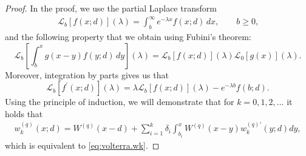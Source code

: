 \documentclass[12pt,reqno]{amsart}
\newcommand{\blue}{\textcolor[rgb]{0.00,0.00,1.00}}
\newcommand{\green}{\textcolor[rgb]{0.00,0.70,.30}}
\theoremstyle{definition}
\theoremstyle{remark}
\begin{document}
\begin{proof}
In the proof, we use the partial Laplace transform
\begin{align*}
\mathcal{L}_{b}[f(x;d)](\lambda)=\int_b^\infty e^{-\lambda x}f(x;d)\,dx,\qquad\text{$b\geq0$,}
\end{align*}
and the following property that we obtain using Fubini's theorem:
$$\mathcal{L}_{b}\left[\int_b^xg(x-y)f(y;d)\,dy\right](\lambda)=
\mathcal{L}_{b}[f(x;d)](\lambda) \mathcal{L}_0 [g(x)](\lambda).$$
Moreover, integration by parts gives us that
$$\mathcal{L}_{b}[f^{\prime}(x;d)](\lambda)=\lambda \mathcal{L}_{b}[f(x;d)](\lambda)- e^{-\lambda b} f(b;d).$$
  Using the principle of induction, we will demonstrate that for $k=0,1,2,\ldots$ it holds that
  \begin{align}
w_k^{(q)}(x;d)=W^{(q)}(x-d)+\sum_{i=1}^k\delta_i \int_{b_i}^xW^{(q)}(x-y)w_k^{(q)\prime}(y;d)dy, \label{w_k_using_delta}
\end{align}
which is equivalent to \eqref{eq:volterra.wk}. 


\end{proof}
\end{document}
